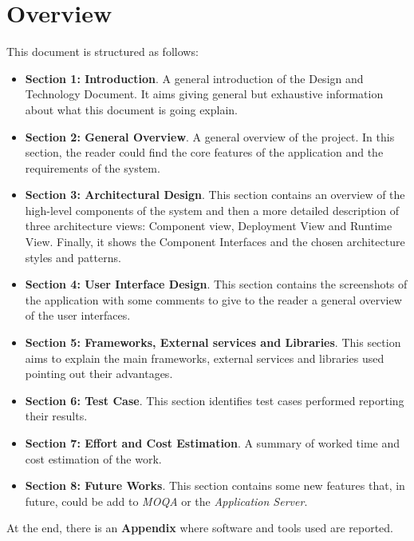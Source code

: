 \section{Overview}
This document is structured as follows:
\begin{itemize}
  \setlength{\itemindent}{-.4in}
  \item[] \textbf{Section 1: Introduction}. A general introduction of the Design and Technology Document. It aims giving general but exhaustive information about what this document is going explain.
  
  \item[] \textbf{Section 2: General Overview}. A general overview of the project. In this section, the reader could find the core features of the application and the requirements of the system.
  
  \item[] \textbf{Section 3: Architectural Design}. This section contains an overview of the high-level components of the system and then a more detailed description of three architecture views: Component view, Deployment View and Runtime View. Finally, it shows the Component Interfaces and the chosen architecture styles and patterns.
  
  \item[] \textbf{Section 4: User Interface Design}. This section contains the screenshots of the application with some comments to give to the reader a general overview of the user interfaces.
  
  \item[] \textbf{Section 5: Frameworks, External services and Libraries}. This section aims to explain the main frameworks, external services and libraries used pointing out their advantages.
  
  \item[] \textbf{Section 6: Test Case}. This section identifies test cases performed reporting their results.
  
  \item[] \textbf{Section 7: Effort and Cost Estimation}. A summary of worked time and cost estimation of the work.
  
  \item[] \textbf{Section 8: Future Works}. This section contains some new features that, in future, could be add to \textit{MOQA} or the \textit{Application Server}.
\end{itemize}

At the end, there is an \textbf{Appendix} where software and tools used are reported.